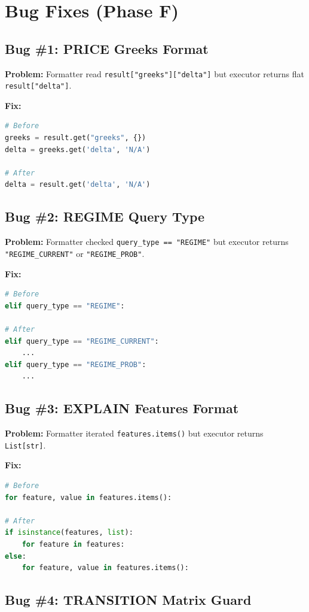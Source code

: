 \documentclass[12pt,oneside,openany]{book}
\begin{document}
\section{Bug Fixes (Phase F)}

\subsection{Bug \#1: PRICE Greeks Format}

\textbf{Problem:} Formatter read \texttt{result["greeks"]["delta"]} but executor returns flat \texttt{result["delta"]}.

\textbf{Fix:}
\begin{lstlisting}[language=Python]
# Before
greeks = result.get("greeks", {})
delta = greeks.get('delta', 'N/A')

# After
delta = result.get('delta', 'N/A')
\end{lstlisting}

\subsection{Bug \#2: REGIME Query Type}

\textbf{Problem:} Formatter checked \texttt{query_type == "REGIME"} but executor returns \texttt{"REGIME_CURRENT"} or \texttt{"REGIME_PROB"}.

\textbf{Fix:}
\begin{lstlisting}[language=Python]
# Before
elif query_type == "REGIME":

# After
elif query_type == "REGIME_CURRENT":
    ...
elif query_type == "REGIME_PROB":
    ...
\end{lstlisting}

\subsection{Bug \#3: EXPLAIN Features Format}

\textbf{Problem:} Formatter iterated \texttt{features.items()} but executor returns \texttt{List[str]}.

\textbf{Fix:}
\begin{lstlisting}[language=Python]
# Before
for feature, value in features.items():

# After
if isinstance(features, list):
    for feature in features:
else:
    for feature, value in features.items():
\end{lstlisting}

\subsection{Bug \#4: TRANSITION Matrix Guard}
\end{document}
